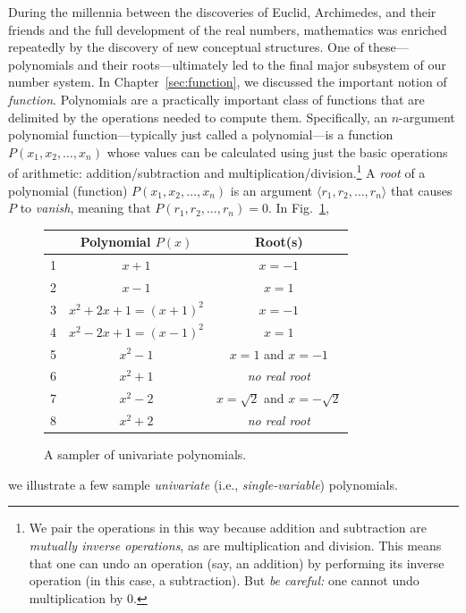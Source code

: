 During the millennia between the discoveries of Euclid, Archimedes, and
their friends and the full development of the real numbers,
mathematics was enriched repeatedly by the discovery of new conceptual
structures.  One of these---polynomials
and their
%
roots---ultimately led to the final major subsystem of our number
system.  In Chapter~\ref{sec:function}, we discussed the important
notion of {\em function}.  Polynomials  are a
practically important class of functions that are delimited by the
operations needed to compute them.  Specifically, an $n$-argument
polynomial function---typically just called a polynomial---is a
function $P(x_1, x_2, \ldots, x_n)$ whose values can be calculated
using just the basic operations of arithmetic: addition/subtraction
and multiplication/division.\footnote{We pair the operations in this
  way because addition and subtraction are {\em mutually inverse
    operations},  as are
  multiplication and division.  This means that one can undo an
  operation (say, an addition) by performing its inverse operation (in
  this case, a subtraction).  But {\em be careful:} one cannot undo
  multiplication by $0$.}  A {\it root}  of a
polynomial (function) $P(x_1, x_2, \ldots, x_n)$ is an argument
$\langle r_1, r_2, \ldots, r_n \rangle$ that causes $P$ to {\it
  vanish}, meaning that $P(r_1, r_2, \ldots, r_n) = 0$.  In Fig.~\ref{fig:sample-polys},
 \begin{figure}[htb]
\begin{center}
\begin{tabular}{|c|c|c|}
\hline
 & Polynomial $P(x)$ & Root(s) \\
\hline
1 &
$x+1$  &  $x= -1$ \\
2 &
$x-1$  &  $x= 1$ \\
3 &
$x^2 + 2x +1 = (x+1)^2$ & $x = -1$ \\ 
4 &
$x^2 - 2x +1 = (x-1)^2$ & $x = 1$ \\ 
5 &
$x^2 - 1$ & $x = 1$ and $x= -1$ \\
6 &
$x^2 + 1$ & {\em no real root} \\
7 &
$x^2 -2$  & $x = \sqrt{2}$ and $x = - \sqrt{2}$ \\
8 &
$x^2 + 2$ & {\em no real root} \\
\hline
\end{tabular}
\end{center} 
 \caption{A sampler of univariate polynomials.}
 \label{fig:sample-polys}
 \end{figure}
 we illustrate a few sample {\em univariate} (i.e., {\em
  single-variable}) polynomials. 

